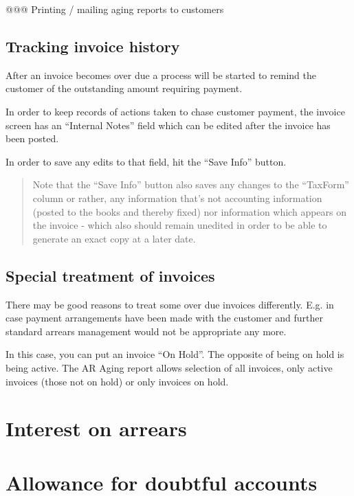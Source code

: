 @@@ Printing / mailing aging reports to customers


\subsection{Tracking invoice history}
\label{subsec-business-processes-credit-risk-arrears-reminding}

After an invoice becomes over due a process will be started to remind
the \gls{customer} of the outstanding amount requiring payment.

In order to keep records of actions taken to chase customer payment,
the invoice screen has an ``Internal Notes'' field which can be edited
after the invoice has been posted.

In order to save any edits to that field, hit the ``Save Info'' button.

\begin{quote}
Note that the ``Save Info'' button also saves any changes to the ``TaxForm'' column or
rather, any information that's not accounting information (posted to the books and
thereby fixed) nor information which appears on the invoice - which also should remain
unedited in order to be able to generate an exact copy at a later date.
\end{quote}


\subsection{Special treatment of invoices}
\label{subsec-business-processes-credit-risk-arrears-special-treatment}

There may be good reasons to treat some over due invoices differently. E.g. in case
payment arrangements have been made with the \gls{customer} and further standard arrears
management would not be appropriate any more.

In this case, you can put an invoice ``On Hold''. The opposite of being on hold is
being active. The AR Aging report allows selection of all invoices, only active
invoices (those not on hold) or only invoices on hold.


\section{Interest on arrears}
\label{sec-business-processes-credit-risk-interest-on-arrears}

\section{Allowance for doubtful accounts}
\label{sec-business-processes-credit-risk-allowance-doubtful-accounts}


